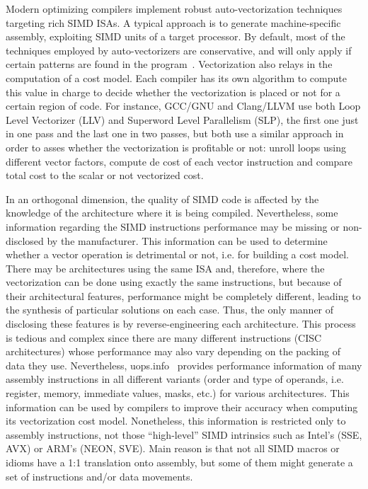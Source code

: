 Modern optimizing compilers implement robust auto-vectorization techniques
targeting rich SIMD ISAs. A typical approach is to generate machine-specific
assembly, exploiting SIMD units of a target processor. By default, most of the
techniques employed by auto-vectorizers are conservative, and will only apply
if certain patterns are found in the program~\cite{citeneeded}. Vectorization
also relays in the computation of a cost model. Each compiler has its own
algorithm to compute this value in charge to decide whether the vectorization
is placed or not for a certain region of code. For instance, GCC/GNU and
Clang/LLVM use both Loop Level Vectorizer (LLV) and Superword Level Parallelism
(SLP), the first one just in one pass and the last one in two passes, but both
use a similar approach in order to asses whether the vectorization is
profitable or not: unroll loops using different vector factors, compute de cost
of each vector instruction and compare total cost to the scalar or not
vectorized cost.

In an orthogonal dimension, the quality of SIMD code is affected by the
knowledge of the architecture where it is being compiled. Nevertheless, some
information regarding the SIMD instructions performance may be missing or
non-disclosed by the manufacturer. This information can be used to determine
whether a vector operation is detrimental or not, i.e. for building a cost
model. There may be architectures using the same ISA and, therefore, where the
vectorization can be done using exactly the same instructions, but because of
their architectural features, performance might be completely different,
leading to the synthesis of particular solutions on each case. Thus, the only
manner of disclosing these features is by reverse-engineering each
architecture. This process is tedious and complex since there are many
different instructions (CISC architectures) whose performance may also vary
depending on the packing of data they use. Nevertheless,
uops.info~\cite{bib:uops} provides performance information of many assembly
instructions in all different variants (order and type of operands, i.e.
register, memory, immediate values, masks, etc.) for various architectures.
This information can be used by compilers to improve their accuracy when
computing its vectorization cost model. Nonetheless, this information is
restricted only to assembly instructions, not those ``high-level'' SIMD
intrinsics such as Intel's (SSE, AVX) or ARM's (NEON, SVE). Main reason is that
not all SIMD macros or idioms have a 1:1 translation onto assembly, but some of
them might generate a set of instructions and/or data movements.


